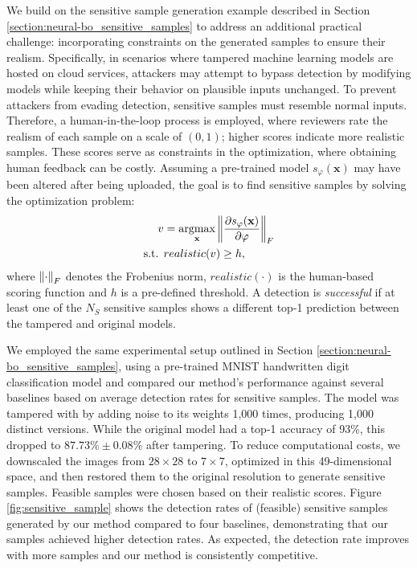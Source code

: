 We build on the sensitive sample generation example described in Section \ref{section:neural-bo_sensitive_samples} to address an additional practical challenge: incorporating constraints on the generated samples to ensure their realism. Specifically, in scenarios where tampered machine learning models are hosted on cloud services, attackers may attempt to bypass detection by modifying models while keeping their behavior on plausible inputs unchanged. To prevent attackers from evading detection, sensitive samples must resemble normal inputs. Therefore, a human-in-the-loop process is employed, where reviewers rate the realism of each sample on a scale of $(0,1)$; higher scores indicate more realistic samples. These scores serve as constraints in the optimization, where obtaining human feedback can be costly. Assuming a pre-trained model $s_\varphi(\mathbf{x})$ may have been altered after being uploaded, the goal is to find sensitive samples by solving the optimization problem: 
\begin{align*}
    v &= \operatorname*{argmax}_\mathbf{x} \norm{\frac{\partial s_\varphi(\mathbf{x})}{\partial \varphi}}_F 
    \\
    \text{s.t. } &  realistic(v) \ge h, 
\end{align*}
where $\norm{\cdot}_F$ denotes the Frobenius norm, $realistic(\cdot)$ is the human-based scoring function and $h$ is a pre-defined threshold. A detection is \emph{successful} if at least one of the $N_S$ sensitive samples shows a different top-1 prediction between the tampered and original models.  

We employed the same experimental setup outlined in Section \ref{section:neural-bo_sensitive_samples}, using a pre-trained MNIST handwritten digit classification model and compared our method's performance against several baselines based on average detection rates for sensitive samples. The model was tampered with by adding noise to its weights 1,000 times, producing 1,000 distinct versions. While the original model had a top-1 accuracy of 93\%, this dropped to $87.73\% \pm 0.08\%$ after tampering. To reduce computational costs, we downscaled the images from $28 \times 28$ to $7 \times 7$, optimized in this 49-dimensional space, and then restored them to the original resolution to generate sensitive samples. Feasible samples were chosen based on their realistic scores. Figure \ref{fig:sensitive_sample} shows the detection rates of (feasible) sensitive samples generated by our method compared to four baselines, demonstrating that our samples achieved higher detection rates. As expected, the detection rate improves with more samples and our method is consistently competitive.








